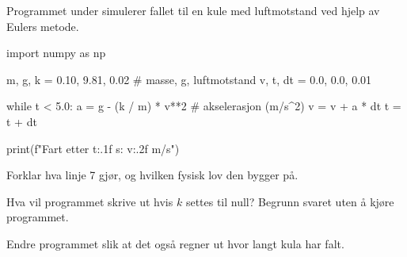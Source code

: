 \documentclass[12pt]{article}
\begin{document}
\begin{oppgave}
Programmet under simulerer fallet til en kule med luftmotstand ved hjelp av Eulers metode.

\begin{python}
import numpy as np

m, g, k = 0.10, 9.81, 0.02     # masse, g, luftmotstand
v, t, dt = 0.0, 0.0, 0.01

while t < 5.0:
    a = g - (k / m) * v**2      # akselerasjon (m/s^2)
    v = v + a * dt
    t = t + dt

print(f"Fart etter {t:.1f} s: {v:.2f} m/s")
\end{python}

\begin{deloppgaver}
  \item Forklar hva linje 7 gjør, og hvilken fysisk lov den bygger på.
  \item Hva vil programmet skrive ut hvis $k$ settes til null? Begrunn svaret uten å kjøre programmet.
  \item Endre programmet slik at det også regner ut hvor langt kula har falt.
\end{deloppgaver}
\end{oppgave}
\end{document}
